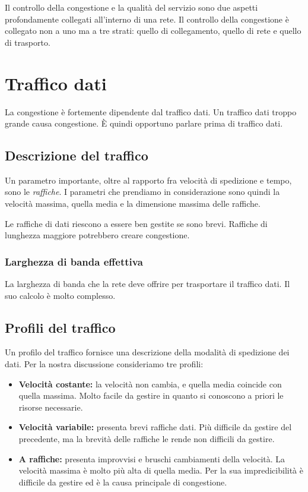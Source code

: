 Il controllo della congestione e la qualità del servizio sono due aspetti profondamente collegati all'interno di una rete. Il controllo della congestione è collegato non a uno ma a tre strati: quello di collegamento, quello di rete e quello di trasporto.

\section{Traffico dati}
    La congestione è fortemente dipendente dal traffico dati. Un traffico dati troppo grande causa congestione. È quindi opportuno parlare prima di traffico dati.
    
    \subsection{Descrizione del traffico}
        Un parametro importante, oltre al rapporto fra velocità di spedizione e tempo, sono le \textit{raffiche}. I parametri che prendiamo in considerazione sono quindi la velocità massima, quella media e la dimensione massima delle raffiche.
        
        Le raffiche di dati riescono a essere ben gestite se sono brevi. Raffiche di lunghezza maggiore potrebbero creare congestione.
        
        \subsubsection{Larghezza di banda effettiva}
            La larghezza di banda che la rete deve offrire per trasportare il traffico dati. Il suo calcolo è molto complesso.
            
    \subsection{Profili del traffico}
        Un profilo del traffico fornisce una descrizione della modalità di spedizione dei dati. Per la nostra discussione consideriamo tre profili:
        \begin{itemize}
            \item \textbf{Velocità costante:} la velocità non cambia, e quella media coincide con quella massima. Molto facile da gestire in quanto si conoscono a priori le risorse necessarie.
            
            \item \textbf{Velocità variabile:} presenta brevi raffiche dati. Più difficile da gestire del precedente, ma la brevità delle raffiche le rende non difficili da gestire.
            
            \item \textbf{A raffiche:} presenta improvvisi e bruschi cambiamenti della velocità. La velocità massima è molto più alta di quella media. Per la sua impredicibilità è difficile da gestire ed è la causa principale di congestione.
        \end{itemize}
        
